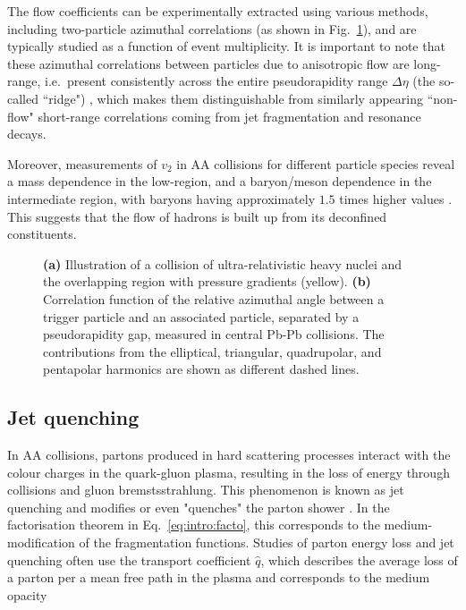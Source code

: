 The flow coefficients can be experimentally extracted using various methods, including two-particle azimuthal correlations (as shown in Fig.~\ref{fig:colls:aflow}), and are typically studied as a function of event multiplicity. It is important to note that these azimuthal correlations between particles due to anisotropic flow are long-range, i.e.\ present consistently across the entire pseudorapidity range $\Delta \eta$ (the so-called ``ridge") \cite{luzumFlowFluctuationsLongrange2011}, which makes them distinguishable from similarly appearing ``non-flow" short-range correlations coming from jet fragmentation and resonance decays.
 
Moreover, measurements of $v_2$ in AA collisions for different particle species reveal a mass dependence in the low-\pt region, and a baryon/meson dependence in the intermediate \pt region, with baryons having approximately $1.5$ times higher values \cite{alicecollaborationEllipticFlowIdentified2015}. This suggests that the flow of hadrons is built up from its deconfined constituents.

\begin{figure}[H]
\hspace{1em}
\caption{\textbf{(a)} Illustration of a collision of ultra-relativistic heavy nuclei and the overlapping region with pressure gradients (yellow). \cite{schadeApplicationsHolographyStrongly2012} \textbf{(b)} Correlation function of the relative azimuthal angle between a trigger particle and an associated particle, separated by a pseudorapidity gap, measured in central Pb-Pb collisions. The contributions from the elliptical, triangular, quadrupolar, and pentapolar harmonics are shown as different dashed lines. \cite{alicecollaborationHigherHarmonicAnisotropic2011}}
\label{fig:colls:aflow}
\end{figure}

\subsection{Jet quenching}

In AA collisions, partons produced in hard scattering processes interact with the colour charges in the quark-gluon plasma, resulting in the loss of energy through collisions and gluon bremstsstrahlung. This phenomenon is known as jet quenching and modifies or even "quenches" the parton shower \cite{gyulassyJetQuenchingDense1990, wangEffectJetQuenching1998}. In the factorisation theorem in Eq.~\ref{eq:intro:facto}, this corresponds to the medium-modification of the fragmentation functions. Studies of parton energy loss and jet quenching often use the transport coefficient $\hat{q}$, which describes the average \pt loss of a parton per a mean free path in the plasma and corresponds to the medium opacity

